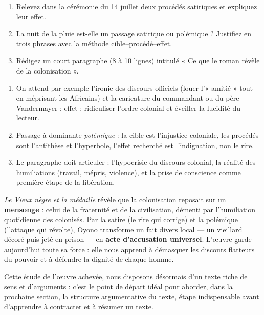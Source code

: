 \documentclass[11pt]{article}
\newcommand{\cle}[1]{{\popxbold\color{popdark}#1}}
\begin{document}
\begin{exercice}
\begin{enumerate}
\item Relevez dans la cérémonie du 14 juillet deux procédés satiriques et expliquez leur effet.
\item La nuit de la pluie est-elle un passage satirique ou polémique ? Justifiez en trois phrases avec la méthode cible--procédé--effet.
\item Rédigez un court paragraphe (8 à 10 lignes) intitulé « Ce que le roman révèle de la colonisation ».
\end{enumerate}
\end{exercice}

\begin{corrige}
\begin{enumerate}
\item On attend par exemple l'ironie des discours officiels (louer l'« amitié » tout en méprisant les Africains) et la caricature du commandant ou du père Vandermayer ; effet : ridiculiser l'ordre colonial et éveiller la lucidité du lecteur.
\item Passage à dominante \emph{polémique} : la cible est l'injustice coloniale, les procédés sont l'antithèse et l'hyperbole, l'effet recherché est l'indignation, non le rire.
\item Le paragraphe doit articuler : l'hypocrisie du discours colonial, la réalité des humiliations (travail, mépris, violence), et la prise de conscience comme première étape de la libération.
\end{enumerate}
\end{corrige}

\begin{aretenir}
\emph{Le Vieux nègre et la médaille} révèle que la colonisation reposait sur un \textbf{mensonge} : celui de la fraternité et de la civilisation, démenti par l'humiliation quotidienne des colonisés. Par la satire (le rire qui corrige) et la polémique (l'attaque qui révolte), Oyono transforme un fait divers local — un vieillard décoré puis jeté en prison — en \textbf{acte d'accusation universel}. L'œuvre garde aujourd'hui toute sa force : elle nous apprend à démasquer les discours flatteurs du pouvoir et à défendre la dignité de chaque homme.
\end{aretenir}

Cette étude de l'œuvre achevée, nous disposons désormais d'un texte riche de sens et d'arguments : c'est le point de départ idéal pour aborder, dans la prochaine section, la \cle{structure argumentative du texte}, étape indispensable avant d'apprendre à contracter et à résumer un texte.
\end{document}
